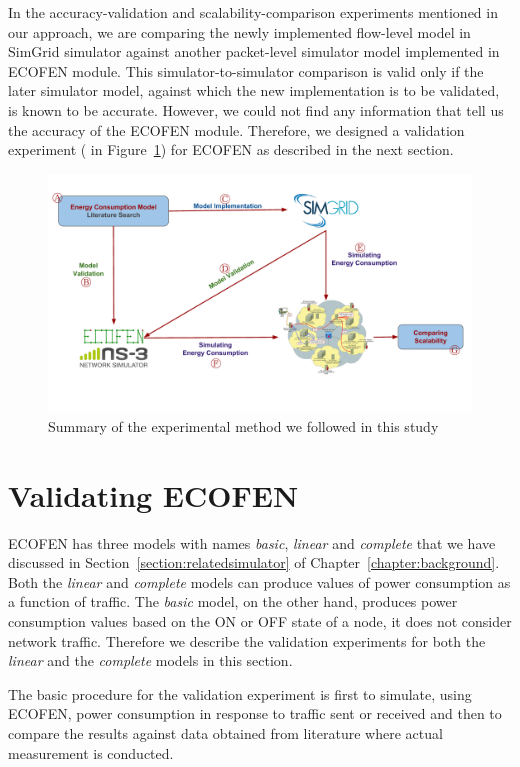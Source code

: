 In the accuracy-validation and scalability-comparison experiments mentioned in our approach, we are comparing the newly implemented flow-level model in SimGrid simulator against another packet-level simulator model implemented in ECOFEN module. This simulator-to-simulator comparison is valid only if the later simulator model, against which the new implementation is to be validated, is known to be accurate. However, we could not find any information that tell us the accuracy of the ECOFEN module. Therefore, we designed a validation experiment ( in Figure~\ref{fig:approach}) for ECOFEN as described in the next section. 
\begin{figure}[ht]
	\begin{center}
		\includegraphics[width=13cm]{images/approach.pdf}
		\vspace*{-1.0cm}
		\caption{Summary of the experimental method we followed in this study}
		\label{fig:approach}
	\end{center}
\end{figure}
\section{Validating ECOFEN}
ECOFEN has three models with names \emph{basic}, \emph{linear} and \emph{complete} that we have discussed in Section~\ref{section:relatedsimulator} of Chapter~\ref{chapter:background}. Both the \emph{linear} and \emph{complete} models can produce values of power consumption as a function of traffic. The  \emph{basic} model, on the other hand, produces power consumption values based on the ON or OFF state of a node, it does not consider network traffic. Therefore we describe the validation experiments for both the \emph{linear} and the \emph{complete} models in this section. 
 
The basic procedure for the validation experiment is first to simulate, using ECOFEN, power consumption in response to traffic sent or received and then to compare the results against data obtained from literature where actual measurement is conducted.

